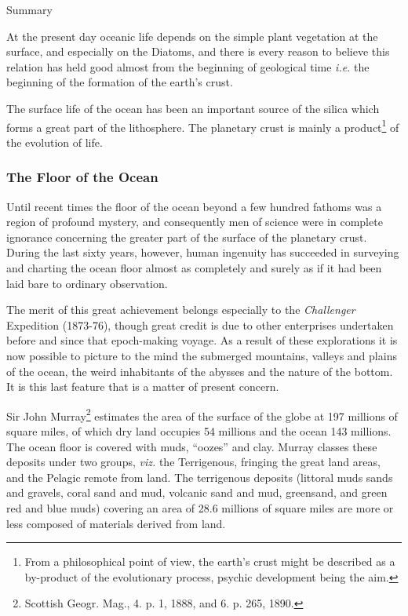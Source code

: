 \documentclass[a4paper, 12pt, oneside]{article}
\begin{document}
\bigskip
\centerline{Summary} 

At the present day oceanic life depends on the simple plant vegetation at the surface, and especially on the Diatoms, and there is every reason to believe this relation has held good almost from the beginning of geological time \emph{i.e.} the beginning of the formation of the earth's crust.

The surface life of the ocean has been an important source of the silica which forms a great part of the lithosphere. The planetary crust is mainly a product\footnote{From a philosophical point of view, the earth's crust might be described as a by-product of the evolutionary process, psychic development being the aim.} of the evolution of life.

\subsubsection{The Floor of the Ocean}

Until recent times the floor of the ocean beyond a few hundred fathoms was a region of profound mystery, and consequently men of science were in complete ignorance concerning the greater part of the surface of the planetary crust. During the last sixty years, however, human ingenuity has succeeded in surveying and charting the ocean floor almost as completely and surely as if it had been laid bare to ordinary observation.

The merit of this great achievement belongs especially to the \emph{Challenger} Expedition (1873-76), though great credit is due to other enterprises undertaken before and since that epoch-making voyage. As a result of these explorations it is now possible to picture to the mind the submerged mountains, valleys and plains of the ocean, the weird inhabitants of the abysses and the nature of the bottom. It is this last feature that is a matter of present concern.

Sir John Murray\footnote{Scottish Geogr. Mag., 4. p. 1, 1888, and 6. p. 265, 1890. } estimates the area of the surface of the globe at 197 millions of square miles, of which dry land occupies 54 millions and the ocean 143 millions. The ocean floor is covered with muds, ``oozes'' and clay. Murray classes these deposits under two groups, \emph{viz.} the Terrigenous, fringing the great land areas, and the Pelagic remote from land. The terrigenous deposits (littoral muds sands and gravels, coral sand and mud, volcanic sand and mud, greensand, and green red and blue muds) covering an area of 28.6 millions of square miles are more or less composed of materials derived from land.
\end{document}
